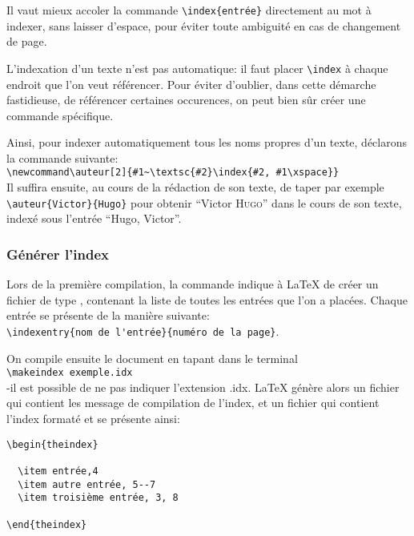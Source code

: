 \begin{attention}
Il vaut mieux accoler la commande \verb+\index{entrée}+ directement au  mot à indexer, sans laisser d'espace, pour éviter toute ambiguité en cas de changement de page.

\end{attention}

L'indexation d'un texte n'est pas automatique: il faut placer \verb+\index+ à chaque endroit  que l'on veut référencer. Pour éviter d'oublier, dans cette démarche fastidieuse, de référencer certaines occurences, on  peut bien sûr créer une commande  spécifique.

Ainsi, pour indexer automatiquement tous les noms propres d'un texte, déclarons la commande suivante:\\
 \verb+\newcommand\auteur[2]{#1~\textsc{#2}\index{#2, #1\xspace}}+\\
Il suffira ensuite, au cours de la rédaction de son texte, de taper par exemple \verb|\auteur{Victor}{Hugo}| pour obtenir \enquote{Victor \textsc{Hugo}} dans le cours de son texte, indexé sous l'entrée \enquote{Hugo, Victor}.


\subsubsection{Générer l'index}


 Lors de la première compilation, la commande \commande{\makeindex} indique à \LaTeX{} de créer un fichier de type , contenant la liste de toutes les entrées que l'on a placées. Chaque entrée se présente de la manière suivante:\\
\verb+\indexentry{nom de l'entrée}{numéro de la page}+.



On compile ensuite le document en tapant dans le terminal \\ \verb+\makeindex exemple.idx + \\
-il est possible de ne pas indiquer l'extension .idx. \LaTeX{} génère alors un fichier  qui contient les message de compilation de l'index, et un fichier  qui contient l'index formaté et se présente ainsi:


\begin{verbatim}
\begin{theindex}

  \item entrée,4
  \item autre entrée, 5--7
  \item troisième entrée, 3, 8	

\end{theindex} 

\end{verbatim}

